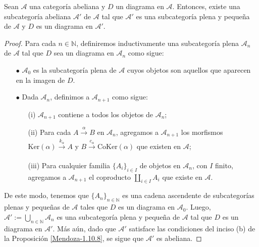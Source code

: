 \documentclass[tesis]{subfiles}
\begin{document}
\begin{Teo}\label{Mendoza-1.10.9}
    Sean $\mathscr{A}$ una categoría abeliana y $D$ un diagrama en $\mathscr{A}$. Entonces, existe una subcategoría abeliana $\mathscr{A}'$ de $\mathscr{A}$ tal que $\mathscr{A}'$ es una subcategoría plena y pequeña de $\mathscr{A}$ y $D$ es un diagrama en $\mathscr{A}'$.
\end{Teo}

\begin{proof}

    Para cada $n\in\mathbb{N}$, definiremos inductivamente una subcategoría plena $\mathscr{A}_n$ de $\mathscr{A}$ tal que $D$ sea un diagrama en $\mathscr{A}_n$ como sigue:

    \begin{itemize}
    
        \item[$\bullet$] $\mathscr{A}_0$ es la subcategoría plena de $\mathscr{A}$ cuyos objetos son aquellos que aparecen en la imagen de $D$.

        \item[$\bullet$] Dada $\mathscr{A}_n$, definimos a $\mathscr{A}_{n+1}$ como sigue:

            \begin{itemize}
            
                \item[(i)] $\mathscr{A}_{n+1}$ contiene a todos los objetos de $\mathscr{A}_n$;

                \item[(ii)] Para cada $A\xrightarrow[]{\alpha} B$ en $\mathscr{A}_n$, agregamos a $\mathscr{A}_{n+1}$ los morfismos $\text{Ker}(\alpha)\xrightarrow[]{k_\alpha}A$ y $B\xrightarrow[]{c_\alpha}\text{CoKer}(\alpha)$ que existen en $\mathscr{A}$;

                \item[(iii)] Para cualquier familia $\{A_i\}_{i\in I}$ de objetos en $\mathscr{A}_n$, con $I$ finito, agregamos a $\mathscr{A}_{n+1}$ el coproducto $\coprod_{i\in I}A_i$ que existe en $\mathscr{A}$. %
            \end{itemize}
    \end{itemize}

    De este modo, tenemos que $\{A_n\}_{n\in\mathbb{N}}$ es una cadena ascendente de subcategorías plenas y pequeñas de $\mathscr{A}$ tales que $D$ es un diagrama en $\mathscr{A}_0$. Luego, $\mathscr{A}' := \bigcup_{n\in\mathbb{N}}\mathscr{A}_n$ es una subcategoría plena y pequeña de $\mathscr{A}$ tal que $D$ es un diagrama en $\mathscr{A}'$. Más aún, dado que $\mathscr{A}'$ satisface las condiciones del inciso (b) de la Proposición \ref{Mendoza-1.10.8}, se sigue que $\mathscr{A}'$ es abeliana.
\end{proof}
\end{document}
